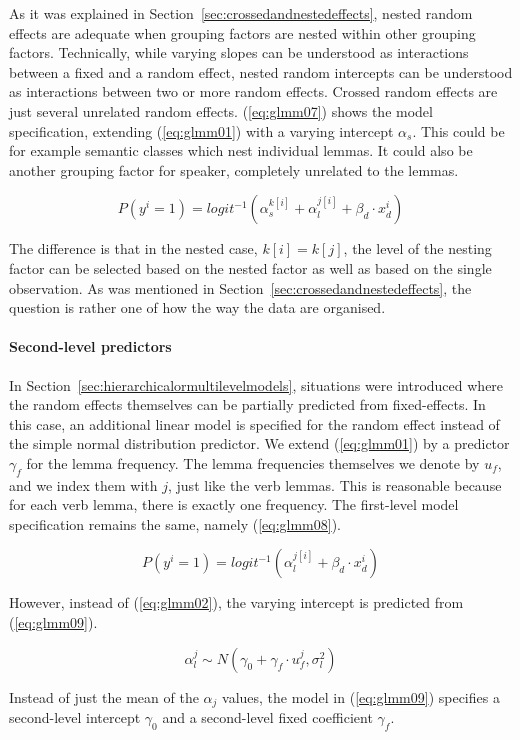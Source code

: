 As it was explained in Section~\ref{sec:crossedandnestedeffects}, nested random effects are adequate when grouping factors are nested within other grouping factors.
Technically, while varying slopes can be understood as interactions between a fixed and a random effect, nested random intercepts can be understood as interactions between two or more random effects.
Crossed random effects are just several unrelated random effects.
(\ref{eq:glmm07}) shows the model specification, extending (\ref{eq:glmm01}) with a varying intercept $\alpha_s$.
This could be for example semantic classes which nest individual lemmas.
It could also be another grouping factor for speaker, completely unrelated to the lemmas.

\begin{equation}
  P(y^i=1)=logit^{-1}(\alpha_{s}^{k[i]}+\alpha_{l}^{j[i]}+\beta_d\cdot x_d^i)
  \label{eq:glmm07}
\end{equation}

The difference is that in the nested case, $k[i]=k[j]$, \ie the level of the nesting factor can be selected based on the nested factor as well as based on the single observation.
As was mentioned in Section~\ref{sec:crossedandnestedeffects}, the question is rather one of how the way the data are organised.

\paragraph{Second-level predictors}

In Section~\ref{sec:hierarchicalormultilevelmodels}, situations were introduced where the random effects themselves can be partially predicted from fixed-effects.
In this case, an additional linear model is specified for the random effect instead of the simple normal distribution predictor.
We extend (\ref{eq:glmm01}) by a predictor $\gamma_f$ for the lemma frequency.
The lemma frequencies themselves we denote by $u_f$, and we index them with $j$, just like the verb lemmas.
This is reasonable because for each verb lemma, there is exactly one frequency.
The first-level model specification remains the same, namely (\ref{eq:glmm08}).

\begin{equation}
  P(y^i=1)=logit^{-1}(\alpha_{l}^{j[i]}+\beta_d\cdot x_d^i)
  \label{eq:glmm08}
\end{equation}

However, instead of (\ref{eq:glmm02}), the varying intercept is predicted from (\ref{eq:glmm09}).

\begin{equation}
  \alpha_l^j\sim N(\gamma_0+\gamma_f\cdot u_f^j,\sigma_l^2)
  \label{eq:glmm09}
\end{equation}

Instead of just the mean of the $\alpha_j$ values, the model in (\ref{eq:glmm09}) specifies a second-level intercept $\gamma_0$ and a second-level fixed coefficient $\gamma_f$.

